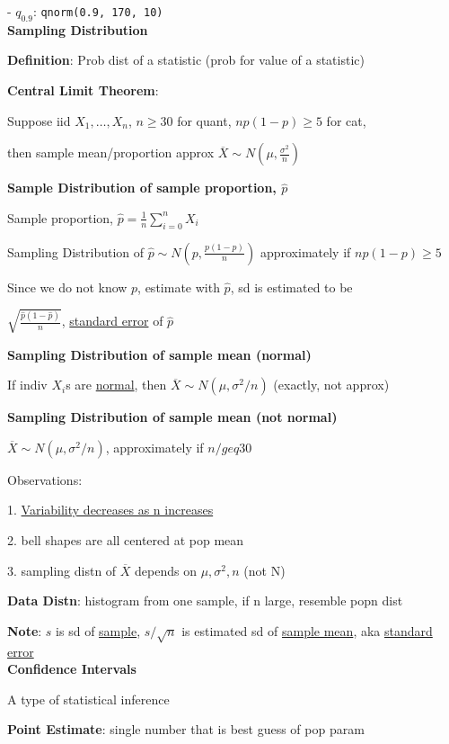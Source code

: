 \documentclass[10pt, a4paper]{article}
\newcommand{\highlight}[1]{{\color{red}\textbf{#1}}}
\newcommand{\header}[1]{{\normalsize\textbf{#1}}}
\begin{document}
\begin{multicols*}{3}
		- $q_0.9$: \texttt{qnorm(0.9, 170, 10)}\\

		\header{Sampling Distribution}

		\textbf{Definition}: Prob dist of a statistic (prob for value of a statistic)

		\textbf{Central Limit Theorem}: 
		
		Suppose iid $X_1, \dots, X_n$, $n \geq 30$ for quant, $np(1-p) \geq 5$ for cat,

		then sample mean/proportion approx $\overline{X} \sim N(\mu, \frac{\sigma^2}{n})$

		\textbf{Sample Distribution of sample proportion, $\hat{p}$}

		Sample proportion, $\hat{p} = \frac{1}{n} \sum_{i = 0}^{n}X_i$

		Sampling Distribution of $\hat{p} \sim N(p, \frac{p(1-p)}{n})$ approximately if $np(1-p) \geq 5$

		Since we do not know $p$, estimate with $\hat{p}$, sd is estimated to be 
		
		\centerline{$\sqrt{\frac{\hat{p}(1-\hat{p})}{n}}$, \underline{standard error} of $\hat{p}$}

		\textbf{Sampling Distribution of sample mean (normal)}

		If indiv $X_i$s are \underline{normal}, then $\overline{X} \sim N(\mu, \sigma^2 / n)$ (exactly, not approx)

		\textbf{Sampling Distribution of sample mean (not normal)}

		$\overline{X} \sim N(\mu, \sigma^2 / n)$, approximately if $n /geq 30$

		Observations:

		1. \underline{Variability decreases as n increases}

		2. bell shapes are all centered at pop mean

		3. sampling distn of $\overline{X}$ depends on $\mu, \sigma^2, n$ (not N)

		\textbf{Data Distn}: histogram from one sample, if n large, resemble popn dist

		\highlight{Note}: $s$ is sd of \underline{sample}, $s/\sqrt{n}$ is estimated sd of \underline{sample mean}, aka \underline{standard error}\\

		\header{Confidence Intervals}

		A type of statistical inference

		\textbf{Point Estimate}: single number that is best guess of pop param


\end{multicols*}
\end{document}
